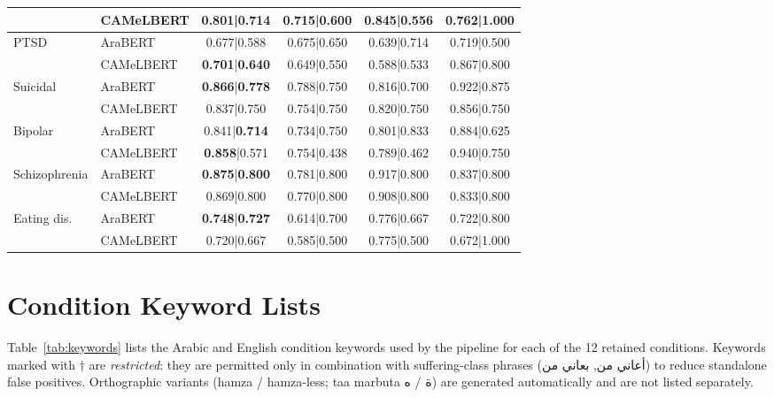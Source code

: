 \documentclass[11pt]{article}
\begin{document}
\begin{table}[t]
{\begin{tabular}{llcccc}
 & CAMeLBERT & 0.801|\textbf{0.714} & 0.715|0.600 & 0.845|0.556 & 0.762|1.000 \\
\midrule
\multirow{2}{*}{PTSD}
 & AraBERT & 0.677|0.588 & 0.675|0.650 & 0.639|0.714 & 0.719|0.500 \\
 & CAMeLBERT & \textbf{0.701}|\textbf{0.640} & 0.649|0.550 & 0.588|0.533 & 0.867|0.800 \\
\midrule
\multirow{2}{*}{Suicidal}
 & AraBERT & \textbf{0.866}|\textbf{0.778} & 0.788|0.750 & 0.816|0.700 & 0.922|0.875 \\
 & CAMeLBERT & 0.837|0.750 & 0.754|0.750 & 0.820|0.750 & 0.856|0.750 \\
\midrule
\multirow{2}{*}{Bipolar}
 & AraBERT & 0.841|\textbf{0.714} & 0.734|0.750 & 0.801|0.833 & 0.884|0.625 \\
 & CAMeLBERT & \textbf{0.858}|0.571 & 0.754|0.438 & 0.789|0.462 & 0.940|0.750 \\
\midrule
\multirow{2}{*}{Schizophrenia}
 & AraBERT & \textbf{0.875}|\textbf{0.800} & 0.781|0.800 & 0.917|0.800 & 0.837|0.800 \\
 & CAMeLBERT & 0.869|0.800 & 0.770|0.800 & 0.908|0.800 & 0.833|0.800 \\
\midrule
\multirow{2}{*}{Eating dis.}
 & AraBERT & \textbf{0.748}|\textbf{0.727} & 0.614|0.700 & 0.776|0.667 & 0.722|0.800 \\
 & CAMeLBERT & 0.720|0.667 & 0.585|0.500 & 0.775|0.500 & 0.672|1.000 \\
\bottomrule
\end{tabular}%
}
\end{table}

\section{Condition Keyword Lists}
\label{app:keywords}

Table~\ref{tab:keywords} lists the Arabic and English condition
keywords used by the pipeline for each of the 12 retained conditions.
Keywords marked with $\dagger$ are \textit{restricted}: they are
permitted only in combination with suffering-class phrases
(\foreignlanguage{arabic}{أعاني من}, \foreignlanguage{arabic}{بعاني من})
to reduce standalone false positives. Orthographic variants (hamza /
hamza-less; taa marbuta \foreignlanguage{arabic}{ة} /
\foreignlanguage{arabic}{ه}) are generated automatically and are not
listed separately.
\end{document}
